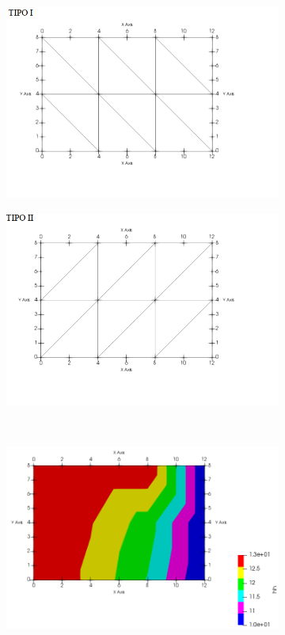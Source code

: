 \documentclass{article} %
\begin{document}
\begin{figure}[H]
	\centering
		\begin{subfigure}[b]{0.44\textwidth}
		\includegraphics[width=\textwidth]{option1_am}
		\label{}
	\end{subfigure}
	\begin{subfigure}[b]{0.44\textwidth}
		\includegraphics[width=\textwidth]{option2_am}

		\label{}
	\end{subfigure}\\
	\begin{subfigure}[b]{0.49\textwidth}
	\includegraphics[width=\textwidth]{option1_ahh}


\end{subfigure}
\end{figure}
\end{document}
